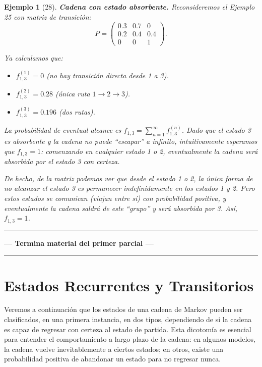 \documentclass[12pt]{book}
\newtheorem{example}{Ejemplo}[chapter]
\begin{document}
\begin{example}[28]
\textbf{Cadena con estado absorbente.} Reconsideremos el Ejemplo 25 con matriz de transición:
\[
P = \begin{pmatrix}
0.3 & 0.7 & 0 \\
0.2 & 0.4 & 0.4 \\
0 & 0 & 1
\end{pmatrix}.
\]

Ya calculamos que:
\begin{itemize}
    \item $f_{1,3}^{(1)} = 0$ (no hay transición directa desde 1 a 3).
    \item $f_{1,3}^{(2)} = 0.28$ (única ruta $1 \to 2 \to 3$).
    \item $f_{1,3}^{(3)} = 0.196$ (dos rutas).
\end{itemize}

La probabilidad de eventual alcance es $f_{1,3} = \sum_{n=1}^{\infty} f_{1,3}^{(n)}$. Dado que el estado 3 es absorbente y la cadena no puede ``escapar'' a infinito, intuitivamente esperamos que $f_{1,3} = 1$: comenzando en cualquier estado 1 o 2, eventualmente la cadena será absorbida por el estado 3 con certeza.

De hecho, de la matriz podemos ver que desde el estado 1 o 2, la única forma de no alcanzar el estado 3 es permanecer indefinidamente en los estados 1 y 2. Pero estos estados se comunican (viajan entre sí) con probabilidad positiva, y eventualmente la cadena saldrá de este ``grupo'' y será absorbida por 3. Así, $f_{1,3} = 1$.
\end{example}

\vspace{20pt}
\hrule
\vspace{10pt}
{
\color{blue}
\noindent\textbf{--- Termina material del primer parcial ---}
}

\vspace{10pt}
\hrule
\vspace{20pt}


\section{Estados Recurrentes y Transitorios}

Veremos a continuación que los estados de una cadena de Markov pueden ser clasificados, en una primera instancia, en dos tipos, dependiendo de si la cadena es capaz de regresar con certeza al estado de partida. Esta dicotomía es esencial para entender el comportamiento a largo plazo de la cadena: en algunos modelos, la cadena vuelve inevitablemente a ciertos estados; en otros, existe una probabilidad positiva de abandonar un estado para no regresar nunca.
\end{document}

